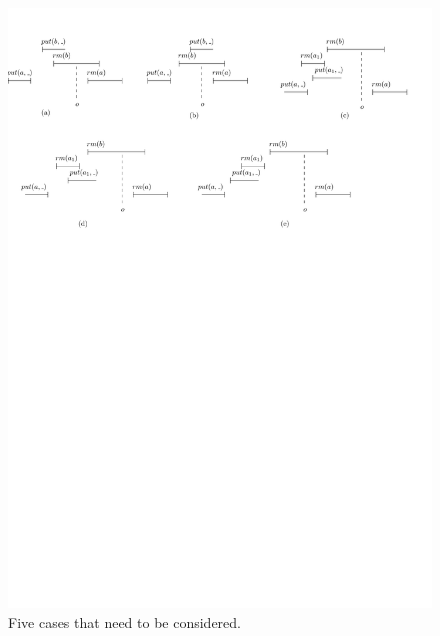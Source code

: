 \begin{figure}[htbp]
  \centering
  \includegraphics[width=0.8 \textwidth]{figures/PIC-HIS-FiveEnumerations.pdf}
  \caption{{\color {red} Five cases that need to be considered.}}
  \label{fig:five enumerations}
\end{figure}



